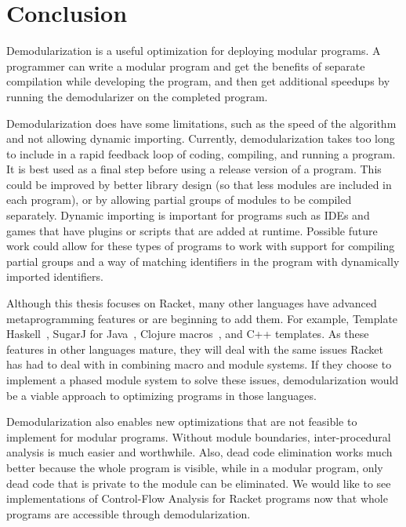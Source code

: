 \chapter{Conclusion}
\label{chap:conclusion}

Demodularization is a useful optimization for deploying modular programs. 
A programmer can write a modular program and get the benefits of separate compilation while developing the program, and then get additional speedups by running the demodularizer on the completed program.

Demodularization does have some limitations, such as the speed of the algorithm and not allowing dynamic importing.
Currently, demodularization takes too long to include in a rapid feedback loop of coding, compiling, and running a program.
It is best used as a final step before using a release version of a program.
This could be improved by better library design (so that less modules are included in each program), or by allowing partial groups of modules to be compiled separately.
Dynamic importing is important for programs such as IDEs and games that have plugins or scripts that are added at runtime.
Possible future work could allow for these types of programs to work with support for compiling partial groups and a way of matching identifiers in the program with dynamically imported identifiers.

Although this thesis focuses on Racket, many other languages have advanced metaprogramming features or are beginning to add them. 
For example, Template Haskell~\cite{template-haskell}, SugarJ for Java~\cite{sugarj}, Clojure macros~\cite{clojure}, and C++ templates.
As these features in other languages mature, they will deal with the same issues Racket has had to deal with in combining macro and module systems. 
If they choose to implement a phased module system to solve these issues, demodularization would be a viable approach to optimizing programs in those languages.

Demodularization also enables new optimizations that are not feasible to implement for modular programs.
Without module boundaries, inter-procedural analysis is much easier and worthwhile.
Also, dead code elimination works much better because the whole program is visible, while in a modular program, only dead code that is private to the module can be eliminated.
We would like to see implementations of Control-Flow Analysis for Racket programs now that whole programs are accessible through demodularization.

